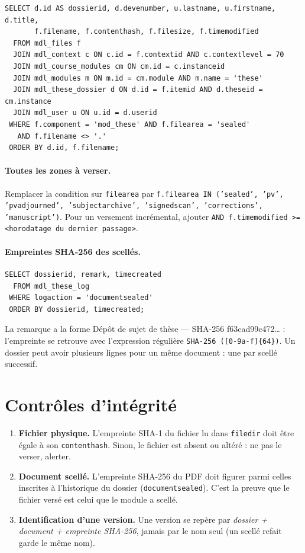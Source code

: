 \documentclass[11pt,a4paper]{article}
\begin{document}
\begin{Verbatim}
SELECT d.id AS dossierid, d.devenumber, u.lastname, u.firstname, d.title,
       f.filename, f.contenthash, f.filesize, f.timemodified
  FROM mdl_files f
  JOIN mdl_context c ON c.id = f.contextid AND c.contextlevel = 70
  JOIN mdl_course_modules cm ON cm.id = c.instanceid
  JOIN mdl_modules m ON m.id = cm.module AND m.name = 'these'
  JOIN mdl_these_dossier d ON d.id = f.itemid AND d.theseid = cm.instance
  JOIN mdl_user u ON u.id = d.userid
 WHERE f.component = 'mod_these' AND f.filearea = 'sealed'
   AND f.filename <> '.'
 ORDER BY d.id, f.filename;
\end{Verbatim}

\paragraph{Toutes les zones à verser.} Remplacer la condition sur \texttt{filearea} par
\texttt{f.filearea IN ('sealed', 'pv', 'pvadjourned', 'subjectarchive', 'signedscan',
'corrections', 'manuscript')}. Pour un versement incrémental, ajouter
\texttt{AND f.timemodified >= <horodatage du dernier passage>}.

\paragraph{Empreintes SHA-256 des scellés.}

\begin{Verbatim}
SELECT dossierid, remark, timecreated
  FROM mdl_these_log
 WHERE logaction = 'documentsealed'
 ORDER BY dossierid, timecreated;
\end{Verbatim}

La remarque a la forme \og Dépôt de sujet de thèse — SHA-256 f63cad99c472\ldots\fg{} : l'empreinte se
retrouve avec l'expression régulière \verb|SHA-256 ([0-9a-f]{64})|. Un dossier peut avoir plusieurs
lignes pour un même document : une par scellé successif.

\section{Contrôles d'intégrité}\label{sec:integrite}

\begin{enumerate}
  \item \textbf{Fichier physique.} L'empreinte SHA-1 du fichier lu dans \texttt{filedir} doit être égale
        à son \texttt{contenthash}. Sinon, le fichier est absent ou altéré : ne pas le verser, alerter.
  \item \textbf{Document scellé.} L'empreinte SHA-256 du PDF doit figurer parmi celles inscrites à
        l'historique du dossier (\texttt{documentsealed}). C'est la preuve que le fichier versé est
        celui que le module a scellé.
  \item \textbf{Identification d'une version.} Une version se repère par \emph{dossier + document +
        empreinte SHA-256}, jamais par le nom seul (un scellé refait garde le même nom).
\end{enumerate}
\end{document}
